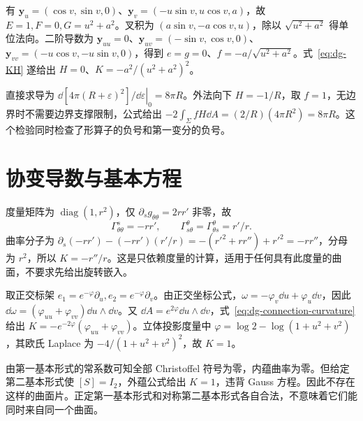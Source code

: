 \begin{solve}
有 $\mathbf y_u=(\cos v,\sin v,0)$、$\mathbf y_v=(-u\sin v,u\cos v,a)$，故 $E=1,F=0,G=u^2+a^2$。叉积为 $(a\sin v,-a\cos v,u)$，除以 $\sqrt{u^2+a^2}$ 得单位法向。二阶导数为 $\mathbf y_{uu}=0$、$\mathbf y_{uv}=(-\sin v,\cos v,0)$、$\mathbf y_{vv}=(-u\cos v,-u\sin v,0)$，得到 $e=g=0$、$f=-a/\sqrt{u^2+a^2}$。式~\eqref{eq:dg-KH} 遂给出 $H=0$、$K=-a^2/(u^2+a^2)^2$。
\end{solve}

\begin{solve}
直接求导为 $\left.\dd[4\pi(R+\varepsilon)^2]/\dd\varepsilon\right|_0=8\pi R$。外法向下 $H=-1/R$，取 $f=1$，无边界时不需要边界支撑限制，公式给出 $-2\int_\Sigma fH\dd A=(2/R)(4\pi R^2)=8\pi R$。这个检验同时检查了形算子的负号和第一变分的负号。
\end{solve}

\section{协变导数与基本方程}
\begin{solve}
度量矩阵为 $\operatorname{diag}(1,r^2)$，仅 $\partial_sg_{\theta\theta}=2rr'$ 非零，故
\[
 \Gamma^s_{\theta\theta}=-rr',\qquad
 \Gamma^\theta_{s\theta}=\Gamma^\theta_{\theta s}=r'/r.
\]
曲率分子为 $\partial_s(-rr')-(-rr')(r'/r)=-(r'^2+rr'')+r'^2=-rr''$，分母为 $r^2$，所以 $K=-r''/r$。这是只依赖度量的计算，适用于任何具有此度量的曲面，不要求先给出旋转嵌入。
\end{solve}

\begin{solve}
取正交标架 $e_1=e^{-\varphi}\partial_u,e_2=e^{-\varphi}\partial_v$。由正交坐标公式，$\omega=-\varphi_v\dd u+\varphi_u\dd v$，因此 $\dd\omega=(\varphi_{uu}+\varphi_{vv})\dd u\wedge\dd v$。又 $\dd A=e^{2\varphi}\dd u\wedge\dd v$，式~\eqref{eq:dg-connection-curvature} 给出 $K=-e^{-2\varphi}(\varphi_{uu}+\varphi_{vv})$。立体投影度量中 $\varphi=\log2-\log(1+u^2+v^2)$，其欧氏 Laplace 为 $-4/(1+u^2+v^2)^2$，故 $K=1$。
\end{solve}

\begin{solve}
由第一基本形式的常系数可知全部 Christoffel 符号为零，内蕴曲率为零。但给定第二基本形式使 $[S]=I_2$，外蕴公式给出 $K=1$，违背 Gauss 方程。因此不存在这样的曲面片。正定第一基本形式和对称第二基本形式各自合法，不意味着它们能同时来自同一个曲面。
\end{solve}

